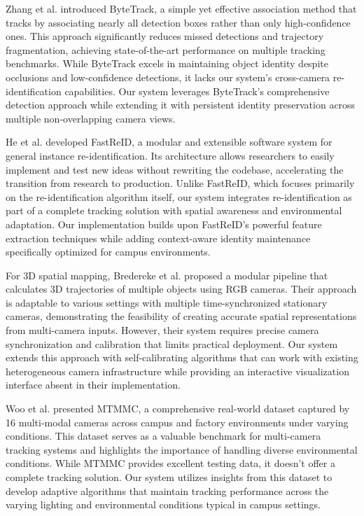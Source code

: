 Zhang et al. \cite{bytetrack} introduced ByteTrack, a simple yet effective association method that tracks by associating nearly all detection boxes rather than only high-confidence ones. This approach significantly reduces missed detections and trajectory fragmentation, achieving state-of-the-art performance on multiple tracking benchmarks. While ByteTrack excels in maintaining object identity despite occlusions and low-confidence detections, it lacks our system's cross-camera re-identification capabilities. Our system leverages ByteTrack's comprehensive detection approach while extending it with persistent identity preservation across multiple non-overlapping camera views.


He et al. \cite{fastreid} developed FastReID, a modular and extensible software system for general instance re-identification. Its architecture allows researchers to easily implement and test new ideas without rewriting the codebase, accelerating the transition from research to production. Unlike FastReID, which focuses primarily on the re-identification algorithm itself, our system integrates re-identification as part of a complete tracking solution with spatial awareness and environmental adaptation. Our implementation builds upon FastReID's powerful feature extraction techniques while adding context-aware identity maintenance specifically optimized for campus environments.


For 3D spatial mapping, Bredereke et al. \cite{modular3d} proposed a modular pipeline that calculates 3D trajectories of multiple objects using RGB cameras. Their approach is adaptable to various settings with multiple time-synchronized stationary cameras, demonstrating the feasibility of creating accurate spatial representations from multi-camera inputs. However, their system requires precise camera synchronization and calibration that limits practical deployment. Our system extends this approach with self-calibrating algorithms that can work with existing heterogeneous camera infrastructure while providing an interactive visualization interface absent in their implementation.


Woo et al. \cite{mtmmc} presented MTMMC, a comprehensive real-world dataset captured by 16 multi-modal cameras across campus and factory environments under varying conditions. This dataset serves as a valuable benchmark for multi-camera tracking systems and highlights the importance of handling diverse environmental conditions. While MTMMC provides excellent testing data, it doesn't offer a complete tracking solution. Our system utilizes insights from this dataset to develop adaptive algorithms that maintain tracking performance across the varying lighting and environmental conditions typical in campus settings.


